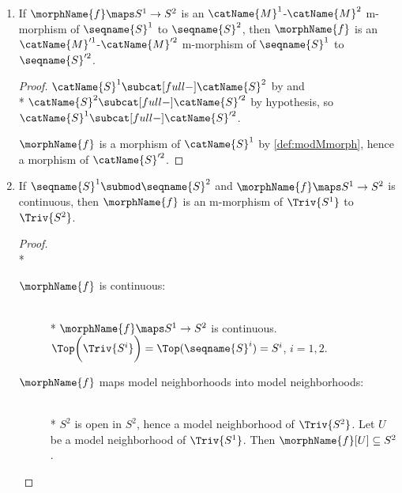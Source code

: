 \documentclass{article}
\begin{document}
\begin{lemma}
\begin{enumerate}
\begin{proof}
Let $u \in S^1$, $U_u$ be a model neighborhood of $\seqname{S}^1$ for
$u$ and $V_u$ be a model neighborhood of $\seqname{S}^2$ for
$v \defeq \morphName{f}(u)$ such that $\morphName{f}[U_u] \subseteq V_u$
and $\morphName{f} \maps U_u \to  V_u$ is a morphism of $\catName{S}^2$.

Since $\catName{S}^2 \subcat[full-] \catName{S}'^2$ by hypothesis,
$\morphName{f} \maps U_u \to  V_u$ is a morphism of $\catName{S}'^2$.
\end{proof}

\item
\label{M-morph:catmorphismorphtosup}
If $\morphName{f} \maps S^1 \to S^2$ is an
$\catName{M}^1$-$\catName{M}^2$ m-morphism of $\seqname{S}^1$ to
$\seqname{S}^2$, then $\morphName{f}$ is an
$\catName{M}'^1$-$\catName{M}'^2$ m-morphism of $\seqname{S}^1$ to
$\seqname{S}'^2$.

\begin{proof}
$\catName{S}^1 \subcat[full-] \catName{S}^2$ by  and \\*
$\catName{S}^2 \subcat[full-] \catName{S}'^2$ by hypothesis, so
$\catName{S}^1 \subcat[full-] \catName{S}'^2$.

$\morphName{f}$ is a morphism of $\catName{S}^1$ by
\cref{def:modMmorph}, hence a morphism of $\catName{S}'^2$.
\end{proof}

\item
\label{M-morph:contisstrict}
If $\seqname{S}^1 \submod \seqname{S}^2$ and
$\morphName{f} \maps S^1 \to S^2$ is continuous, then $\morphName{f}$ is
an m-morphism of $\Triv{S^1}$ to $\Triv{S^2}$.

\begin{proof}
\leavevmode \\*
\begin{description}
\item[$\morphName{f}$ is continuous:]
\leavevmode \\*
$\morphName{f} \maps S^1 \to S^2$ is continuous.
$
  \Top \biggl ( \Triv{S^i} \biggr ) =
  \Top(\seqname{S}^i) =
  S^i
$,
$i=1,2$.

\item [$\morphName{f}$ maps model neighborhoods into model neighborhoods:]
\leavevmode \\*
$S^2$ is open in $S^2$, hence a model neighborhood of $\Triv{S^2}$.
Let $U$ be a model neighborhood of $\Triv{S^1}$. Then
$\morphName{f}[U] \subseteq S^2$.


\end{description}
\end{proof}
\end{enumerate}
\end{lemma}
\end{document}
